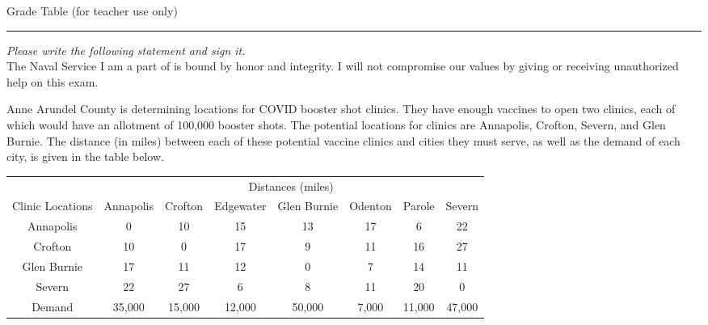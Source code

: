 \documentclass[12pt]{exam}
\begin{document}
\bigskip
\begin{center}
Grade Table (for teacher use only)\\
\addpoints
\gradetable[v][questions]
\end{center}

\noindent
\rule[2ex]{\textwidth}{2pt}

\emph{Please write the following statement and sign it.}\\
The Naval Service I am a part of is bound by honor
and integrity. I will not compromise our values by
giving or receiving unauthorized help on this exam.

\newpage %

\begin{questions}
\question Anne Arundel County is determining locations for COVID booster shot clinics. They have enough vaccines to open two clinics, each of which would have an allotment of 100,000 booster shots. The potential locations for clinics are Annapolis, Crofton, Severn, and Glen Burnie. The distance (in miles) between each of these potential vaccine clinics and cities they must serve, as well as the demand of each city, is given in the table below.

\begin{center}
\begin{small}
\begin{tabular}{c|ccccccc} 
\hline 
                & \multicolumn{7}{c}{Distances (miles)} \\
Clinic Locations   &  Annapolis &  Crofton  &  Edgewater   & Glen Burnie & Odenton     & Parole  & Severn \\ \hline 
 Annapolis         &      0     &   10      &    15        & 13          & 17          & 6       &  22          \\ 
 Crofton           &      10    &    0      &    17        & 9           & 11          & 16      &  27          \\ 
 Glen Burnie       &      17    &   11      &    12        & 0           & 7           & 14      &  11          \\ 
 Severn            &      22    &   27      &    6         & 8           & 11          & 20      &  0            \\ \hline
 Demand           &    35,000  &  15,000   &    12,000    & 50,000      & 7,000       & 11,000  & 47,000
\end{tabular}
\end{small}
\end{center}


\end{questions}
\end{document}
